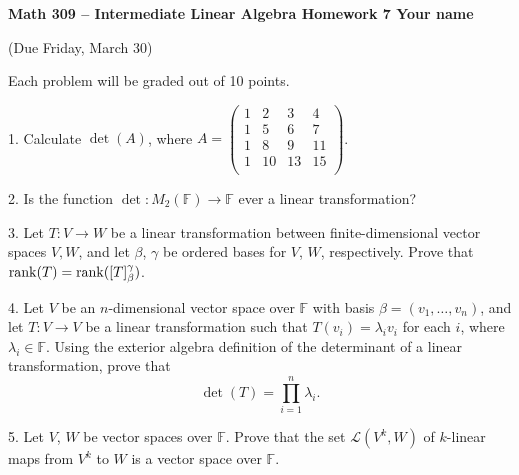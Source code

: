 \documentclass[12pt]{article} %
\newcommand{\F}{\mathbb{F}}
\newcommand{\rk}{{\rm rank}}
\begin{document}
 
\noindent
\textbf{Math 309 -- Intermediate Linear Algebra \quad 
Homework 7 \hfill Your name}\\
\begin{center}
  (Due Friday, March 30)
\end{center}
\medskip

Each problem will be graded out of 10 points.

\vspace{1cm}

\begin{flushleft}

1.  Calculate $\det(A)$, where $A = \left(\begin{matrix}
                                     1 & 2 & 3 & 4 \\
                                     1 & 5 & 6 & 7 \\
                                     1 & 8 & 9 & 11\\
                                     1 & 10 & 13 & 15\\
                                    \end{matrix}\right)$.\\
                                    
\vspace{.5cm}


2.  Is the function $\det: M_2(\F) \rightarrow \F$ ever a linear transformation?\\

\vspace{.5cm}


3.  Let $T: V \rightarrow W$ be a linear transformation between finite-dimensional vector spaces $V,W$, and let $\beta$, $\gamma$ be ordered bases for $V$, $W$, respectively.  Prove that $\rk(T) = \rk([T]_\beta^\gamma)$.\\

\vspace{.5cm}

4.  Let $V$ be an $n$-dimensional vector space over $\F$ with basis $\beta = (v_1, \dots, v_n)$, and let $T: V \rightarrow V$ be a linear transformation such that $T(v_i) = \lambda_i v_i$ for each $i$, where $\lambda_i \in \F$.  Using the exterior algebra definition of the determinant of a linear transformation, prove that \[\det(T) = \prod_{i=1}^n \lambda_i.\]

\vspace{.5cm}

5.  Let $V$, $W$ be vector spaces over $\F$.  Prove that the set $\mathcal{L}(V^k, W)$ of $k$-linear maps from $V^k$ to $W$ is a vector space over $\F$.\\


\end{flushleft}
\end{document}
